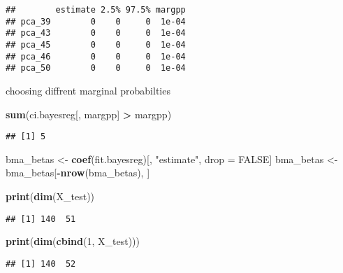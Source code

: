 \documentclass[
]{article}
\newenvironment{Shaded}{\begin{snugshade}}{\end{snugshade}}
\newcommand{\ConstantTok}[1]{\textcolor[rgb]{0.56,0.35,0.01}{#1}}
\newcommand{\DecValTok}[1]{\textcolor[rgb]{0.00,0.00,0.81}{#1}}
\newcommand{\FunctionTok}[1]{\textcolor[rgb]{0.13,0.29,0.53}{\textbf{#1}}}
\newcommand{\NormalTok}[1]{#1}
\newcommand{\OtherTok}[1]{\textcolor[rgb]{0.56,0.35,0.01}{#1}}
\newcommand{\SpecialCharTok}[1]{\textcolor[rgb]{0.81,0.36,0.00}{\textbf{#1}}}
\newcommand{\StringTok}[1]{\textcolor[rgb]{0.31,0.60,0.02}{#1}}
\begin{document}
\begin{verbatim}
##        estimate 2.5% 97.5% margpp
## pca_39        0    0     0  1e-04
## pca_43        0    0     0  1e-04
## pca_45        0    0     0  1e-04
## pca_46        0    0     0  1e-04
## pca_50        0    0     0  1e-04
\end{verbatim}

choosing diffrent marginal probabilties

\begin{Shaded}
\begin{Highlighting}[]
\FunctionTok{sum}\NormalTok{(ci.bayesreg[, }\StringTok{\textquotesingle{}margpp\textquotesingle{}}\NormalTok{] }\SpecialCharTok{\textgreater{}}\NormalTok{ margpp)}
\end{Highlighting}
\end{Shaded}

\begin{verbatim}
## [1] 5
\end{verbatim}

\begin{Shaded}
\begin{Highlighting}[]
\NormalTok{bma\_betas }\OtherTok{\textless{}{-}} \FunctionTok{coef}\NormalTok{(fit.bayesreg)[, }\StringTok{"estimate"}\NormalTok{, drop }\OtherTok{=} \ConstantTok{FALSE}\NormalTok{]}
\NormalTok{bma\_betas }\OtherTok{\textless{}{-}}\NormalTok{ bma\_betas[}\SpecialCharTok{{-}}\FunctionTok{nrow}\NormalTok{(bma\_betas), ]}
\end{Highlighting}
\end{Shaded}

\begin{Shaded}
\begin{Highlighting}[]
\FunctionTok{print}\NormalTok{(}\FunctionTok{dim}\NormalTok{(X\_test))}
\end{Highlighting}
\end{Shaded}

\begin{verbatim}
## [1] 140  51
\end{verbatim}

\begin{Shaded}
\begin{Highlighting}[]
\FunctionTok{print}\NormalTok{(}\FunctionTok{dim}\NormalTok{(}\FunctionTok{cbind}\NormalTok{(}\DecValTok{1}\NormalTok{, X\_test)))}
\end{Highlighting}
\end{Shaded}

\begin{verbatim}
## [1] 140  52
\end{verbatim}
\end{document}
